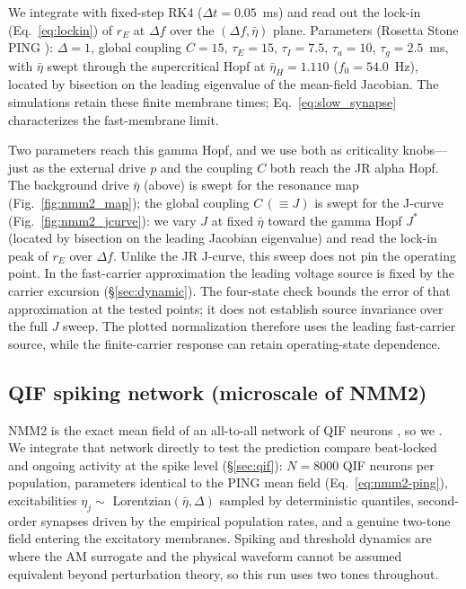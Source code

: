 \documentclass[11pt,a4paper]{article}
\providecommand{\DIFaddtex}[1]{{\protect\color{blue} \sf #1}} %
\providecommand{\DIFdeltex}[1]{{\protect\color{red} \scriptsize #1}} %
\providecommand{\DIFaddbegin}{} %
\providecommand{\DIFaddend}{} %
\providecommand{\DIFdelbegin}{} %
\providecommand{\DIFdelend}{} %
\providecommand{\DIFadd}[1]{\texorpdfstring{\DIFaddtex{#1}}{#1}} %
\providecommand{\DIFdel}[1]{\texorpdfstring{\DIFdeltex{#1}}{}} %
\begin{document}
We integrate with fixed-step RK4 ($\Delta t=0.05$~ms) and read out the lock-in
(Eq.~\eqref{eq:lockin}) of $r_E$ at $\Delta f$ over the $(\Delta f, \bar\eta)$ plane.
Parameters (Rosetta Stone PING \cite{ruffini2025rosetta}): $\Delta=1$, global coupling
$C=15$, $\tau_E=15$, $\tau_I=7.5$, $\tau_a=10$, $\tau_g=2.5$~ms, with $\bar\eta$ swept
through the supercritical Hopf at $\bar\eta_H=1.110$ ($f_0=54.0$~Hz), located by bisection
on the leading eigenvalue of the mean-field Jacobian. The simulations retain these
finite membrane times; Eq.~\eqref{eq:slow_synapse} characterizes the fast-membrane limit.

Two parameters reach this gamma Hopf, and we use both as criticality knobs---just as the
external drive $p$ and the coupling $C$ both reach the JR alpha Hopf. The background drive
$\bar\eta$ (above) is swept for the resonance map (Fig.~\ref{fig:nmm2_map}); the global
coupling $C\,(\equiv J)$ is swept for the J-curve (Fig.~\ref{fig:nmm2_jcurve}): we vary
$J$ at fixed $\bar\eta$ toward the gamma Hopf $J^*$ (located by bisection on the leading
Jacobian eigenvalue) and read the lock-in peak of $r_E$ over $\Delta f$. Unlike the JR
J-curve, this sweep does not pin the operating point. In the fast-carrier
approximation the leading voltage source is fixed by the carrier excursion
(\S\ref{sec:dynamic}). The four-state check bounds the error of that approximation
at the tested points; it does not establish source invariance over the full $J$
sweep. The plotted normalization therefore uses the leading fast-carrier source,
while the finite-carrier response can retain operating-state dependence.

\subsection{QIF spiking network (microscale of NMM2)}\label{sec:qif-methods}
NMM2 is the exact mean field of an all-to-all network of QIF neurons
\cite{montbrio2015,ruffini2025rosetta,clusella2023}\DIFdelbegin \DIFdel{, so we }\DIFdelend \DIFaddbegin \DIFadd{. We }\DIFaddend integrate that network directly
to \DIFdelbegin \DIFdel{test the prediction }\DIFdelend \DIFaddbegin \DIFadd{compare beat-locked and ongoing activity }\DIFaddend at the spike level (\S\ref{sec:qif}): $N=8000$ QIF neurons per
population, parameters identical to the PING mean field (Eq.~\eqref{eq:nmm2-ping}),
excitabilities $\eta_j\sim$ Lorentzian$(\bar\eta,\Delta)$ sampled by deterministic
quantiles, second-order synapses driven by the empirical population rates, and a genuine
two-tone field entering the excitatory membranes. Spiking and threshold dynamics are
where the AM surrogate and the physical waveform cannot be assumed equivalent beyond
perturbation theory, so this run uses two tones throughout.
\end{document}
